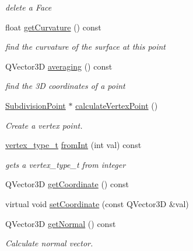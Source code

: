 \begin{DoxyCompactItemize}
\begin{DoxyCompactList}\small\item\em delete a Face \end{DoxyCompactList}\item 
float \hyperlink{classShipCAD_1_1SubdivisionPoint_a674233e056b2450912c90b7fa26b5119}{get\+Curvature} () const 
\begin{DoxyCompactList}\small\item\em find the curvature of the surface at this point \end{DoxyCompactList}\item 
Q\+Vector3D \hyperlink{classShipCAD_1_1SubdivisionPoint_aa92112e6ca48ae0616a45d12de165c0a}{averaging} () const 
\begin{DoxyCompactList}\small\item\em find the 3D coordinates of a point \end{DoxyCompactList}\item 
\hyperlink{classShipCAD_1_1SubdivisionPoint}{Subdivision\+Point} $\ast$ \hyperlink{classShipCAD_1_1SubdivisionPoint_a92632ddbe28fb6901e445b60eab8d3ee}{calculate\+Vertex\+Point} ()
\begin{DoxyCompactList}\small\item\em Create a vertex point. \end{DoxyCompactList}\item 
\hyperlink{namespaceShipCAD_a03171cc921c53a568b778f5131a60deb}{vertex\+\_\+type\+\_\+t} \hyperlink{classShipCAD_1_1SubdivisionPoint_abb85deebb954990a04842710000bc9ac}{from\+Int} (int val) const 
\begin{DoxyCompactList}\small\item\em gets a vertex\+\_\+type\+\_\+t from integer \end{DoxyCompactList}\item 
Q\+Vector3D \hyperlink{classShipCAD_1_1SubdivisionPoint_a285325115089a1b99be4480bf6079bf1}{get\+Coordinate} () const 
\item 
virtual void \hyperlink{classShipCAD_1_1SubdivisionPoint_a98ab99a0ccc4709a40e05b36147c0f55}{set\+Coordinate} (const Q\+Vector3D \&val)
\item 
Q\+Vector3D \hyperlink{classShipCAD_1_1SubdivisionPoint_abc16b03730e723ec56184f7808f4f2a1}{get\+Normal} () const 
\begin{DoxyCompactList}\small\item\em Calculate normal vector. \end{DoxyCompactList}\item 

\end{DoxyCompactItemize}
